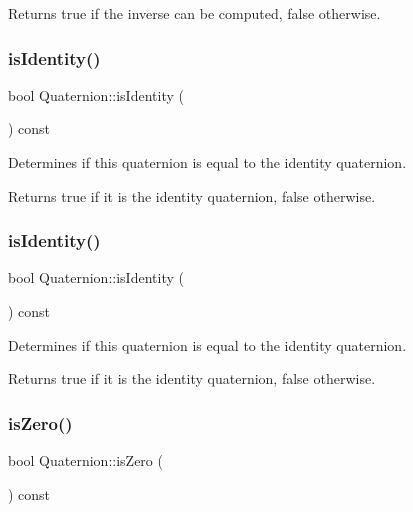 \begin{DoxyReturn}{Returns}
true if the inverse can be computed, false otherwise. 
\end{DoxyReturn}
\mbox{\label{classQuaternion_a64550e3147014607c42d40fc3bb7080b}} 
\subsubsection{\texorpdfstring{is\+Identity()}{isIdentity()}\hspace{0.1cm}{\footnotesize\ttfamily [1/2]}}
{\footnotesize\ttfamily bool Quaternion\+::is\+Identity (\begin{DoxyParamCaption}{ }\end{DoxyParamCaption}) const}

Determines if this quaternion is equal to the identity quaternion.

\begin{DoxyReturn}{Returns}
true if it is the identity quaternion, false otherwise. 
\end{DoxyReturn}
\mbox{\label{classQuaternion_a64550e3147014607c42d40fc3bb7080b}} 
\subsubsection{\texorpdfstring{is\+Identity()}{isIdentity()}\hspace{0.1cm}{\footnotesize\ttfamily [2/2]}}
{\footnotesize\ttfamily bool Quaternion\+::is\+Identity (\begin{DoxyParamCaption}{ }\end{DoxyParamCaption}) const}

Determines if this quaternion is equal to the identity quaternion.

\begin{DoxyReturn}{Returns}
true if it is the identity quaternion, false otherwise. 
\end{DoxyReturn}
\mbox{\label{classQuaternion_ab355dcc6194b9dcf4f303a1afec9f0b2}} 
\subsubsection{\texorpdfstring{is\+Zero()}{isZero()}\hspace{0.1cm}{\footnotesize\ttfamily [1/2]}}
{\footnotesize\ttfamily bool Quaternion\+::is\+Zero (\begin{DoxyParamCaption}{ }\end{DoxyParamCaption}) const}


